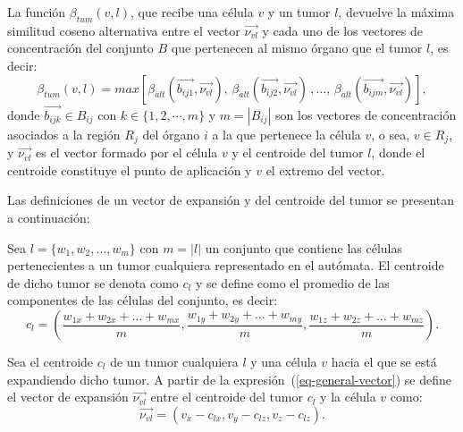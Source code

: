 \begin{definition}
\label{def-beta}
La funci\'on $\beta_{tum}(v,l)$, que recibe una c\'elula $v$ y un tumor $l$, devuelve la m\'axima similitud coseno alternativa entre el vector $\overrightarrow{\nu_{vl}}$ y cada uno de los vectores de concentraci\'on del conjunto $B$ que pertenecen al mismo \'organo que el tumor $l$, es decir:
\begin{equation}
\beta_{tum}(v,l) = max\left[\beta_{alt}(\overrightarrow{b_{ij1}},\overrightarrow{\nu_{vl}}),\,\beta_{alt}(\overrightarrow{b_{ij2}}, \overrightarrow{\nu_{vl}})\,,\ldots,\,\beta_{alt}(\overrightarrow{b_{ijm}}, \overrightarrow{\nu_{vl}})\right], \label{eq-beta}
\end{equation}
donde $\overrightarrow{b_{ijk}} \in B_{ij}$ con $k \in \lbrace 1,2,\cdots,m \rbrace$ y $m=|B_{ij}|$ son los vectores de concentraci\'on asociados a la regi\'on $R_j$ del \'organo $i$ a la que pertenece la c\'elula $v$, o sea, $v \in R_j$, y $\overrightarrow{\nu_{vl}}$ es el vector formado por el c\'elula $v$ y el centroide del tumor $l$, donde el centroide constituye el punto de aplicaci\'on y $v$ el extremo del vector. 
\end{definition}

Las definiciones de un vector de expansi\'on y del centroide del tumor se presentan a continuaci\'on:

\begin{definition}
\label{def-centroid}
Sea $l=\lbrace w_1,w_2,\ldots,w_{m}\rbrace$ con $m=|l|$ un conjunto que contiene las c\'elulas pertenecientes a un tumor cualquiera representado en el aut\'omata. El centroide de dicho tumor se denota como $c_l$ y se define como el promedio de las componentes de las c\'elulas del conjunto, es decir:
\begin{equation}
c_l = \left(\frac{w_{1x} + w_{2x} + \ldots + w_{mx}}{m}, \frac{w_{1y} + w_{2y} + \ldots + w_{my}}{m}, \frac{w_{1z} + w_{2z} + \ldots + w_{mz}}{m} \right). \label{eq-centroid}
\end{equation}
\end{definition}

\begin{definition}
\label{def-exp-vector}
Sea el centroide $c_l$ de un tumor cualquiera $l$ y una c\'elula $v$ hacia el que se est\'a expandiendo dicho tumor. A partir de la expresi\'on~(\ref{eq-general-vector}) se define el vector de expansi\'on $\overrightarrow{\nu_{vl}}$ entre el centroide del tumor $c_l$ y la c\'elula $v$ como:
\begin{equation}
\overrightarrow{\nu_{vl}} = \left(v_x - c_{lx}, v_y - c_{lz}, v_z - c_{lz} \right). \label{eq-exp-vector}
\end{equation}
\end{definition}

